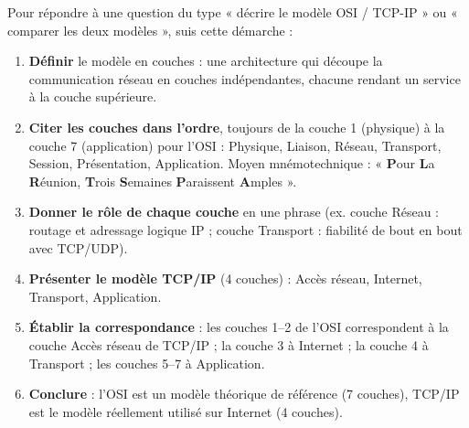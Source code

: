 \documentclass[11pt]{article}
\begin{document}
\begin{methode}
Pour répondre à une question du type « décrire le modèle OSI / TCP-IP » ou « comparer les deux modèles », suis cette démarche :
\begin{enumerate}
\item \textbf{Définir} le modèle en couches : une architecture qui découpe la communication réseau en couches indépendantes, chacune rendant un service à la couche supérieure.
\item \textbf{Citer les couches dans l'ordre}, toujours de la couche 1 (physique) à la couche 7 (application) pour l'OSI : Physique, Liaison, Réseau, Transport, Session, Présentation, Application. Moyen mnémotechnique : « \textbf{P}our \textbf{L}a \textbf{R}éunion, \textbf{T}rois \textbf{S}emaines \textbf{P}araissent \textbf{A}mples ».
\item \textbf{Donner le rôle de chaque couche} en une phrase (ex. couche Réseau : routage et adressage logique IP ; couche Transport : fiabilité de bout en bout avec TCP/UDP).
\item \textbf{Présenter le modèle TCP/IP} (4 couches) : Accès réseau, Internet, Transport, Application.
\item \textbf{Établir la correspondance} : les couches 1--2 de l'OSI correspondent à la couche Accès réseau de TCP/IP ; la couche 3 à Internet ; la couche 4 à Transport ; les couches 5--7 à Application.
\item \textbf{Conclure} : l'OSI est un modèle théorique de référence (7 couches), TCP/IP est le modèle réellement utilisé sur Internet (4 couches).
\end{enumerate}
\end{methode}
\end{document}
